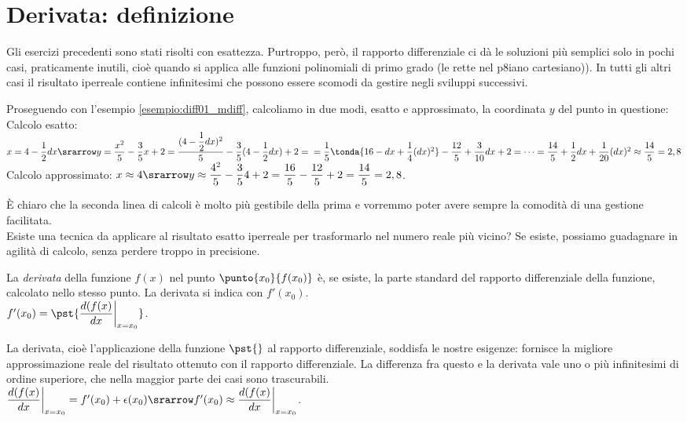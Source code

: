 \section{Derivata: definizione}
\label{sec:diff01_deriv}
Gli esercizi precedenti sono stati risolti con esattezza.
Purtroppo, però, il rapporto differenziale ci dà le soluzioni più semplici 
solo 
in pochi casi, praticamente inutili, cioè quando si applica alle funzioni 
polinomiali di primo grado (le rette nel p8iano cartesiano)).
In tutti gli altri casi il risultato
iperreale contiene infinitesimi che possono essere scomodi da gestire
negli sviluppi successivi.

\begin{esempio}
 Proseguendo con l'esempio \ref{esempio:diff01_mdiff}, calcoliamo in due 
 modi, esatto e approssimato, la coordinata $y$ del punto in questione:\\
 Calcolo esatto: $x=4-\dfrac{1}{2}dx\srarrow 
y=\dfrac{x^2}{5}-\dfrac{3}{5}x+2=
 \dfrac{(4-\dfrac{1}{2}dx)^2}{5}-\dfrac{3}{5}(4-\dfrac{1}{2}dx)+2=\\
 =\dfrac{1}{5}\tonda{16-dx+\dfrac{1}{4}(dx)^2}-\dfrac{12}{5}+\dfrac{3}{10}
 dx+2= \cdots= \dfrac{14}{5}+\dfrac{1}{2}dx+\dfrac{1}{20}(dx)^2\approx 
\dfrac{14}{5} =2,8$\\
 Calcolo approssimato: $x\approx 4\srarrow 
 y\approx\dfrac{4^2}{5}-\dfrac{3}{5}4+2=
 \dfrac{16}{5}-\dfrac{12}{5}+2=\dfrac{14}{5}=2,8$.\\
\end{esempio}

È chiaro che la seconda linea di calcoli è molto più gestibile della prima e
vorremmo poter avere sempre la comodità di una gestione facilitata.\\
Esiste una tecnica da applicare al risultato esatto iperreale per 
trasformarlo nel numero reale più vicino? Se esiste, possiamo guadagnare in 
agilità di calcolo, senza perdere troppo in precisione.

\begin{definizione}
  La \emph{derivata} della funzione $f(x)$ nel punto $\punto{x_0}{f(x_0)}$
  è, se esiste, la parte standard del rapporto differenziale della funzione,
  calcolato nello stesso punto. La derivata si indica con $f'(x_0)$.\\
  $f'(x_0)=\pst{\dfrac{d(f(x)}{dx}\bigg|_{x=x_0}}$.
\end{definizione}

La derivata, cioè l'applicazione della funzione $\pst{}$ al rapporto
differenziale, soddisfa le nostre 
esigenze: fornisce la migliore approssimazione reale del risultato ottenuto 
con il rapporto differenziale. La differenza fra questo e la 
derivata vale uno o più infinitesimi di ordine superiore, che nella 
maggior parte dei casi sono trascurabili.\\
$\dfrac{d(f(x)}{dx}\bigg|_{x=x_0}=f'(x_0)+\epsilon(x_0)\srarrow f'(x_0)
\approx \dfrac{d(f(x)}{dx}\bigg|_{x=x_0}$.


